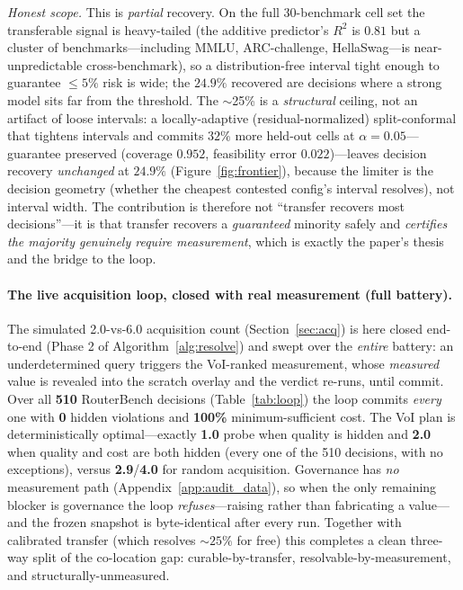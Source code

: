 \documentclass{article} %
\begin{document}
\emph{Honest scope.} This is \emph{partial} recovery. On the full 30-benchmark cell set the transferable signal is heavy-tailed (the additive predictor's $R^2$ is $0.81$ but a cluster of benchmarks---including MMLU, ARC-challenge, HellaSwag---is near-unpredictable cross-benchmark), so a distribution-free interval tight enough to guarantee $\le5\%$ risk is wide; the $24.9\%$ recovered are decisions where a strong model sits far from the threshold. The $\sim$25\% is a \emph{structural} ceiling, not an artifact of loose intervals: a locally-adaptive (residual-normalized) split-conformal that tightens intervals and commits $32\%$ more held-out cells at $\alpha{=}0.05$---guarantee preserved (coverage $0.952$, feasibility error $0.022$)---leaves decision recovery \emph{unchanged} at $24.9\%$ (Figure~\ref{fig:frontier}), because the limiter is the decision geometry (whether the cheapest contested config's interval resolves), not interval width. The contribution is therefore not ``transfer recovers most decisions''---it is that transfer recovers a \emph{guaranteed} minority safely and \emph{certifies the majority genuinely require measurement}, which is exactly the paper's thesis and the bridge to the loop.

\paragraph{The live acquisition loop, closed with real measurement (full battery).}
The simulated 2.0-vs-6.0 acquisition count (Section~\ref{sec:acq}) is here closed end-to-end (Phase 2 of Algorithm~\ref{alg:resolve}) and swept over the \emph{entire} battery: an underdetermined query triggers the VoI-ranked measurement, whose \emph{measured} value is revealed into the scratch overlay and the verdict re-runs, until commit. Over all \textbf{510} RouterBench decisions (Table~\ref{tab:loop}) the loop commits \emph{every} one with \textbf{0} hidden violations and \textbf{100\%} minimum-sufficient cost. The VoI plan is deterministically optimal---exactly \textbf{1.0} probe when quality is hidden and \textbf{2.0} when quality and cost are both hidden (every one of the 510 decisions, with no exceptions), versus \textbf{2.9}/\textbf{4.0} for random acquisition. Governance has \emph{no} measurement path (Appendix~\ref{app:audit_data}), so when the only remaining blocker is governance the loop \emph{refuses}---raising rather than fabricating a value---and the frozen snapshot is byte-identical after every run. Together with calibrated transfer (which resolves ${\sim}25\%$ for free) this completes a clean three-way split of the co-location gap: curable-by-transfer, resolvable-by-measurement, and structurally-unmeasured.
\end{document}

